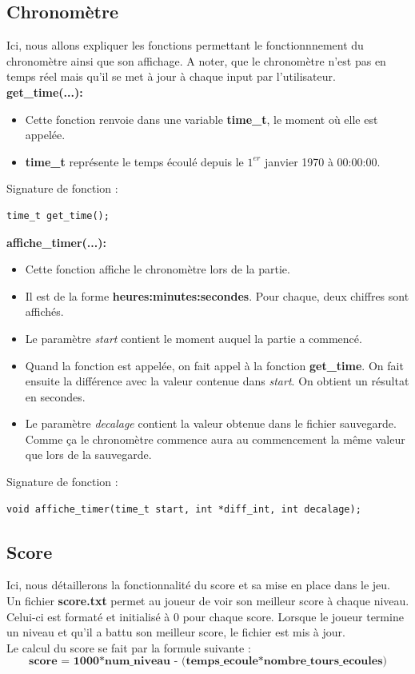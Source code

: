 \documentclass[12pt,french]{article}
\begin{document}
\subsection{Chronomètre}
Ici, nous allons expliquer les fonctions permettant le fonctionnnement du chronomètre ainsi que son affichage.
A noter, que le chronomètre n'est pas en temps réel mais qu'il se met à jour à chaque input par l'utilisateur.\\

\textbf{get\_time(...):}
\begin{itemize}
\item Cette fonction renvoie dans une variable \textbf{time\_t}, le moment où elle est appelée.
\item \textbf{time\_t} représente le temps écoulé depuis le $1^{er}$ janvier 1970 à 00:00:00.
\end{itemize}
Signature de fonction :
\begin{lstlisting}
time_t get_time();
\end{lstlisting}

\textbf{affiche\_timer(...):}
\begin{itemize}
\item Cette fonction affiche le chronomètre lors de la partie.
\item Il est de la forme \textbf{heures:minutes:secondes}. Pour chaque, deux chiffres sont affichés.
\item Le paramètre \textit{start} contient le moment auquel la partie a commencé.
\item Quand la fonction est appelée, on fait appel à la fonction \textbf{get\_time}. On fait ensuite la différence avec la valeur contenue dans \textit{start}. On obtient un résultat en secondes.
\item Le paramètre \textit{decalage} contient la valeur obtenue dans le fichier sauvegarde. Comme ça le chronomètre commence aura au commencement la même valeur que lors de la sauvegarde.
\end{itemize}
Signature de fonction :
\begin{lstlisting}
void affiche_timer(time_t start, int *diff_int, int decalage);
\end{lstlisting}

\subsection{Score}
Ici, nous détaillerons la fonctionnalité du score et sa mise en place dans le jeu.\\ 
Un fichier \textbf{score.txt} permet au joueur de voir son meilleur score à chaque niveau. Celui-ci est formaté et initialisé à 0 pour chaque score. Lorsque le joueur termine un niveau et qu'il a battu son meilleur score, le fichier est mis à jour.\\
Le calcul du score se fait par la formule suivante :
\begin{equation*}
    \textbf{score = 1000*num\_niveau - (temps\_ecoule*nombre\_tours\_ecoules)}
\end{equation*}
\end{document}
